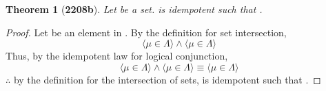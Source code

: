 \documentclass[preview]{standalone}
\newtheorem*{theorem*}{Theorem}
\begin{document}
\begin{theorem*}[\textbf{2208b}] \color{black}
    Let \bm{$\Lambda$} be a set.
    \bm{$\Lambda$} is idempotent such that 
    \bm{$\Lambda \cap \Lambda = \Lambda$}.
\end{theorem*}
\begin{proof} \color{black}
    Let \bm{$\mu$} be an element in \bm{$\Lambda \cap \Lambda$}. 
    By the definition for set intersection,
    \begin{equation*}
        \Big \langle \mu \in \Lambda \Big \rangle 
            \land 
        \Big \langle \mu \in \Lambda \Big \rangle
    \end{equation*}
    Thus, by the idempotent law for logical conjunction,
    \begin{equation*}
        \Big \langle \mu \in \Lambda \Big \rangle 
            \land 
        \Big \langle \mu \in \Lambda \big \rangle 
            \equiv 
        \Big \langle \mu \in \Lambda \Big \rangle
    \end{equation*}
    $\therefore$ by the definition for the intersection of sets,
    \bm{$\Lambda$} is idempotent such that 
    \bm{$\Lambda \cap \Lambda = \Lambda$}.
\color{lightgray} \end{proof}
\end{document}
